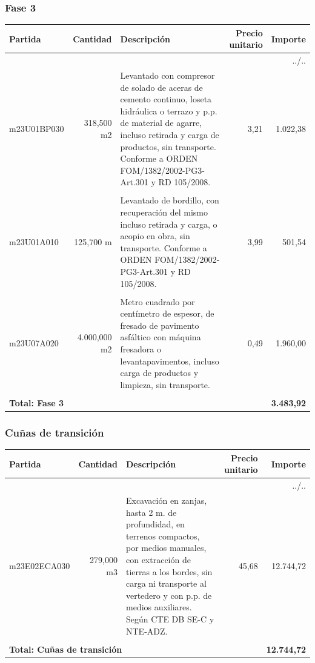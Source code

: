 \documentclass{book}%
\begin{document}
\subsubsection{Fase 3}%
\small%
\begin{longtable}{lrlrr}%
Partida&Cantidad&Descripción&\multicolumn{1}{p{1.5cm}}{Precio unitario}&Importe\\%
\hline%
\endhead%
\multicolumn{5}{r}{../..}\\%
\endfoot%
\hline%
\endlastfoot%
m23U01BP030&   318,500 m2&\multicolumn{1}{p{5cm}}{Levantado con compresor de solado de aceras de cemento continuo, loseta hidráulica o terrazo y p.p. de material de agarre, incluso retirada y carga de productos, sin transporte. Conforme a ORDEN FOM/1382/2002{-}PG3{-}Art.301 y RD 105/2008.}&      3,21&1.022,38\\%
&&&&\\%
m23U01A010&   125,700 m&\multicolumn{1}{p{5cm}}{Levantado de bordillo, con recuperación del mismo incluso retirada y carga, o acopio en obra, sin transporte. Conforme a ORDEN FOM/1382/2002{-}PG3{-}Art.301 y RD 105/2008.}&      3,99&501,54\\%
&&&&\\%
m23U07A020& 4.000,000 m2&\multicolumn{1}{p{5cm}}{Metro cuadrado por centímetro de espesor, de fresado de pavimento asfáltico con máquina fresadora o levantapavimentos, incluso carga de productos y limpieza, sin transporte.}&      0,49&1.960,00\\%
&&&&\\%
\multicolumn{4}{p{8cm}}{\textbf{Total: Fase 3}}&\textbf{3.483,92}\\%
\end{longtable}%
\normalsize

%
\subsubsection{Cuñas de transición}%
\small%
\begin{longtable}{lrlrr}%
Partida&Cantidad&Descripción&\multicolumn{1}{p{1.5cm}}{Precio unitario}&Importe\\%
\hline%
\endhead%
\multicolumn{5}{r}{../..}\\%
\endfoot%
\hline%
\endlastfoot%
m23E02ECA030&   279,000 m3&\multicolumn{1}{p{5cm}}{Excavación en zanjas, hasta 2 m. de profundidad, en terrenos compactos, por medios manuales, con extracción de tierras a los bordes, sin carga ni transporte al vertedero y con p.p. de medios auxiliares. Según CTE DB SE{-}C y NTE{-}ADZ.}&     45,68&12.744,72\\%
&&&&\\%
\multicolumn{4}{p{8cm}}{\textbf{Total: Cuñas de transición}}&\textbf{12.744,72}\\%
\end{longtable}%
\normalsize
\end{document}
